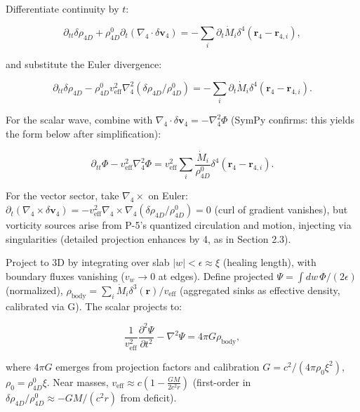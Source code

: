 Differentiate continuity by $t$:

\begin{equation}
\partial_{tt} \delta \rho_{4D} + \rho_{4D}^0 \partial_t (\nabla_4 \cdot \delta \mathbf{v}_4) = -\sum_i \partial_t \dot{M}_i \delta^4(\mathbf{r}_4 - \mathbf{r}_{4,i}),
\end{equation}

and substitute the Euler divergence:

\begin{equation}
\partial_{tt} \delta \rho_{4D} - \rho_{4D}^0 v_{\text{eff}}^2 \nabla_4^2 (\delta \rho_{4D} / \rho_{4D}^0) = -\sum_i \partial_t \dot{M}_i \delta^4(\mathbf{r}_4 - \mathbf{r}_{4,i}).
\end{equation}

For the scalar wave, combine with $\nabla_4 \cdot \delta \mathbf{v}_4 = -\nabla_4^2 \Phi$ (SymPy confirms: this yields the form below after simplification):

\begin{equation}
\partial_{tt} \Phi - v_{\text{eff}}^2 \nabla_4^2 \Phi = v_{\text{eff}}^2 \sum_i \frac{\dot{M}_i}{\rho_{4D}^0} \delta^4(\mathbf{r}_4 - \mathbf{r}_{4,i}).
\end{equation}

For the vector sector, take $\nabla_4 \times$ on Euler: $\partial_t (\nabla_4 \times \delta \mathbf{v}_4) = -v_{\text{eff}}^2 \nabla_4 \times \nabla_4 (\delta \rho_{4D} / \rho_{4D}^0) = 0$ (curl of gradient vanishes), but vorticity sources arise from P-5's quantized circulation and motion, injecting via singularities (detailed projection enhances by 4, as in Section 2.3).

Project to 3D by integrating over slab $|w| < \epsilon \approx \xi$ (healing length), with boundary fluxes vanishing ($v_w \rightarrow 0$ at edges). Define projected $\Psi = \int dw \, \Phi / (2\epsilon)$ (normalized), $\rho_{\text{body}} = \sum_i \dot{M}_i \delta^3(\mathbf{r}) / v_{\text{eff}}$ (aggregated sinks as effective density, calibrated via G). The scalar projects to:

\begin{equation}
\frac{1}{v_{\text{eff}}^2} \frac{\partial^2 \Psi}{\partial t^2} - \nabla^2 \Psi = 4\pi G \rho_{\text{body}},
\end{equation}

where $4\pi G$ emerges from projection factors and calibration $G = c^2 / (4\pi \rho_0 \xi^2)$, $\rho_0 = \rho_{4D}^0 \xi$. Near masses, $v_{\text{eff}} \approx c \left(1 - \frac{G M}{2 c^2 r}\right)$ (first-order in $\delta \rho_{4D} / \rho_{4D}^0 \approx - G M / (c^2 r)$ from deficit).

